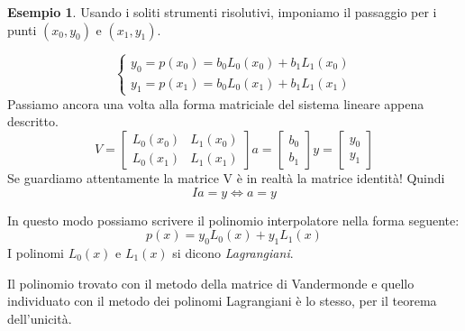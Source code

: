 \documentclass{article}
\theoremstyle{plain}
\theoremstyle{plain}
\theoremstyle{definition}
\theoremstyle{definition}
\newtheorem{esempio}{Esempio}
\begin{document}
\begin{esempio}
	Usando i soliti strumenti risolutivi, imponiamo il passaggio per i punti $(x_{0}, y_{0})$ e $(x_{1}, y_{1})$.
	
	\[
	\begin{cases}
		y_{0}=p(x_{0})=b_{0}L_{0}(x_{0})+b_{1}L_{1}(x_{0}) \\
		y_{1}=p(x_{1})=b_{0}L_{0}(x_{1})+b_{1}L_{1}(x_{1})
	\end{cases}
	\]
	Passiamo ancora una volta alla forma matriciale del sistema lineare appena descritto.
	\[
	V=
	\begin{bmatrix}
		L_{0}(x_{0}) & L_{1}(x_{0}) \\
		L_{0}(x_{1}) & L_{1}(x_{1}) 
	\end{bmatrix}
	a=
	\begin{bmatrix}
		b_{0}\\
		b_{1}
	\end{bmatrix}
	y=
	\begin{bmatrix}
		y_{0}\\
		y_{1}
	\end{bmatrix}
	\]
	Se guardiamo attentamente la matrice V è in realtà la matrice identità! Quindi
	\[
	Ia=y \Leftrightarrow a=y
	\]
	
	In questo modo possiamo scrivere il polinomio interpolatore nella forma seguente:
	\[
	p(x)=y_{0}L_{0}(x)+y_{1}L_{1}(x)
	\]
	I polinomi $L_{0}(x)$ e $L_{1}(x)$ si dicono \emph{Lagrangiani}.
\end{esempio}
Il polinomio trovato con il metodo della matrice di Vandermonde e quello individuato con il metodo dei polinomi Lagrangiani è lo stesso, per il teorema dell'unicità.
\end{document}

